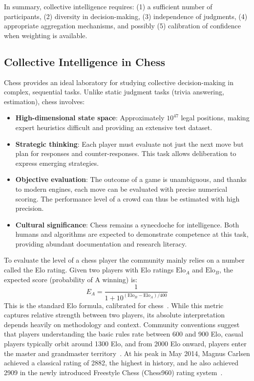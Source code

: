 \documentclass[format=acmsmall, review=false]{acmart}
\begin{document}
In summary, collective intelligence requires:
(1) a sufficient number of participants,
(2) diversity in decision-making,
(3) independence of judgments,
(4) appropriate aggregation mechanisms, and possibly
(5) calibration of confidence when weighting is available.

\subsection{Collective Intelligence in Chess}

Chess provides an ideal laboratory for studying collective decision-making in complex, sequential tasks.
Unlike static judgment tasks (trivia answering, estimation), chess involves:
\begin{itemize}
  \item \textbf{High-dimensional state space}: Approximately \(10^{47}\) legal positions, making expert heuristics difficult and providing an extensive test dataset.
  \item \textbf{Strategic thinking}: Each player must evaluate not just the next move but plan for responses and counter-responses. This task allows deliberation to express emerging strategies.
  \item \textbf{Objective evaluation}: The outcome of a game is unambiguous, and thanks to modern engines, each move can be evaluated with precise numerical scoring. The performance level of a crowd can thus be estimated with high precision.
  \item \textbf{Cultural significance}: Chess remains a synecdoche for intelligence. Both humans and algorithms are expected to demonstrate competence at this task, providing abundant documentation and research literacy.
\end{itemize}

To evaluate the level of a chess player the community mainly relies on a number called the Elo rating.
Given two players with Elo ratings \(\text{Elo}_A\) and \(\text{Elo}_B\), the expected score (probability of A winning) is:
\begin{equation} \label{eqn:elo}
  E_A = \frac{1}{1 + 10^{(\text{Elo}_B - \text{Elo}_A) / 400}}
\end{equation}
This is the standard Elo formula, calibrated for chess~\cite{elo1978}.
While this metric captures relative strength between two players, its absolute interpretation depends heavily on methodology and context.
Community conventions suggest that players understanding the basic rules rate between 600 and 900 Elo, casual players typically orbit around 1300 Elo, and from 2000 Elo onward, players enter the master and grandmaster territory~\cite{elo1978}.
At his peak in May 2014, Magnus Carlsen achieved a classical rating of 2882, the highest in history, and he also achieved 2909 in the newly introduced Freestyle Chess (Chess960) rating system~\cite{carlsen2025}.
\end{document}
